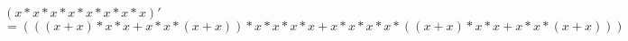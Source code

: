 \documentclass[a4paper, 12 pt]{article}
\begin{document}
	$\left(x*x*x*x*x*x*x*x\right)'$
	$= (((x+x)*x*x+x*x*(x+x))*x*x*x*x+x*x*x*x*((x+x)*x*x+x*x*(x+x)))$
\end{document}
